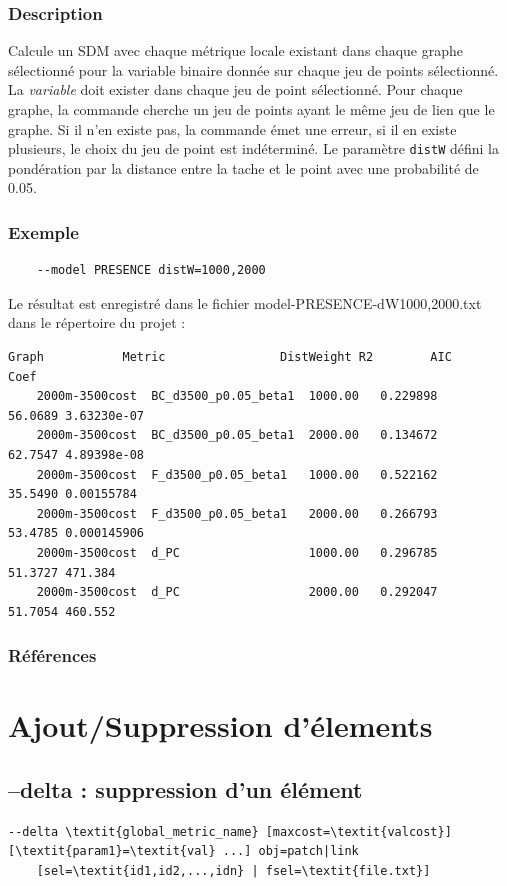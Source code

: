 \documentclass[a4paper,10pt]{report}
\begin{document}
\subsubsection{Description}
Calcule un SDM avec chaque métrique locale existant dans chaque graphe sélectionné pour la variable binaire donnée sur chaque jeu de points sélectionné.
La \textit{variable} doit exister dans chaque jeu de point sélectionné.
Pour chaque graphe, la commande cherche un jeu de points ayant le même jeu de lien que le graphe. Si il n'en existe pas, la commande émet une erreur, si il en existe plusieurs, le choix du jeu de point est indéterminé.
Le paramètre \verb|distW| défini la pondération par la distance entre la tache et le point avec une probabilité de 0.05.

\subsubsection{Exemple}
\begin{Verbatim}
	--model PRESENCE distW=1000,2000
\end{Verbatim}
Le résultat est enregistré dans le fichier model-PRESENCE-dW1000,2000.txt dans le répertoire du projet :
\begin{Verbatim}[tabsize=3]
	Graph           Metric                DistWeight R2        AIC       Coef
	2000m-3500cost  BC_d3500_p0.05_beta1  1000.00	0.229898	56.0689	3.63230e-07
	2000m-3500cost  BC_d3500_p0.05_beta1  2000.00	0.134672	62.7547	4.89398e-08
	2000m-3500cost  F_d3500_p0.05_beta1   1000.00	0.522162	35.5490	0.00155784
	2000m-3500cost  F_d3500_p0.05_beta1   2000.00	0.266793	53.4785	0.000145906
	2000m-3500cost  d_PC                  1000.00	0.296785	51.3727	471.384
	2000m-3500cost  d_PC                  2000.00	0.292047	51.7054	460.552
\end{Verbatim}

\subsubsection{Références}
\cite{2012_SDM, 2012_graphab_EMS, 2013_SDM, 2013_SDM_rainette}

\section{Ajout/Suppression d'élements}
\subsection{--delta : suppression d'un élément}
\begin{Verbatim}[commandchars=\\\{\}]
--delta \textit{global_metric_name} [maxcost=\textit{valcost}] [\textit{param1}=\textit{val} ...] obj=patch|link
	[sel=\textit{id1,id2,...,idn} | fsel=\textit{file.txt}]
\end{Verbatim}
\end{document}
